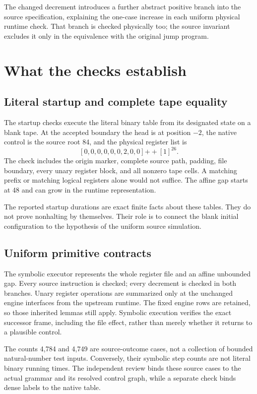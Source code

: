 \documentclass[11pt,letterpaper]{article}
\begin{document}
The changed decrement introduces a further abstract positive branch into
the source specification, explaining the one-case increase in each
uniform physical runtime check. That branch is checked physically too;
the source invariant excludes it only in the equivalence with the
original jump program.

\section{What the checks establish}

\subsection{Literal startup and complete tape equality}

The startup checks execute the literal binary table from its designated
state on a blank tape. At the accepted boundary the head is at position
$-2$, the native control is the source root 84, and the physical register
list is
\[
       [0,0,0,0,0,0,2,0,0]\mathbin{+\!+}[1]^{26}.
\]
The check includes the origin marker, complete source path, padding, file
boundary, every unary register block, and all nonzero tape cells. A
matching prefix or matching logical registers alone would not suffice.
The affine gap starts at 48 and can grow in the runtime representation.

The reported startup durations are exact finite facts about these tables.
They do not prove nonhalting by themselves. Their role is to connect the
blank initial configuration to the hypothesis of the uniform source
simulation.

\subsection{Uniform primitive contracts}

The symbolic executor represents the whole register file and an affine
unbounded gap. Every source instruction is checked; every decrement is
checked in both branches. Unary register operations are summarized only
at the unchanged engine interfaces from the upstream runtime.
The fixed engine rows are retained, so those inherited lemmas still apply.
Symbolic execution verifies the exact successor frame, including the file
effect, rather than merely whether it returns to a plausible control.

The counts 4,784 and 4,749 are source-outcome cases, not a collection of
bounded natural-number test inputs. Conversely, their symbolic step
counts are not literal binary running times. The independent review
binds these source cases to the actual grammar and its resolved control
graph, while a separate check binds dense labels to the native table.
\end{document}
